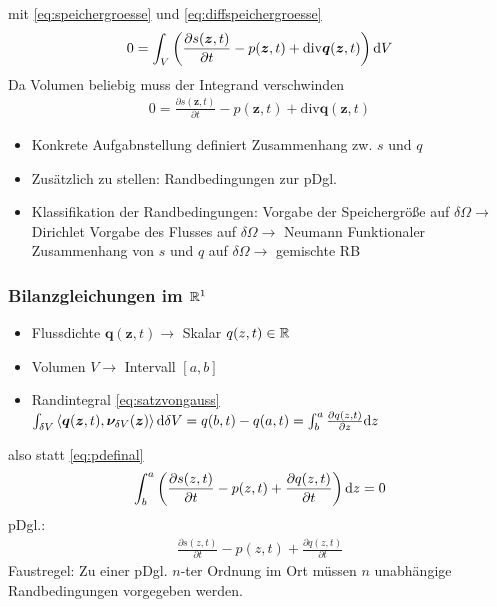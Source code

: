  mit \eqref{eq:speichergroesse} und \eqref{eq:diffspeichergroesse}
 \begin{align}
 \label{eq:pdefinal}
 0 =  \int _V \left( \frac{\partial s(\bm{z},t)}{\partial t}-p(\bm{z},t)+\mathrm{div} \bm{q}(\bm{z},t) \right) \mathrm{d} V
 \end{align}
 Da Volumen beliebig muss der Integrand verschwinden
 \begin{align}
 0 = \frac{\partial s(\bm{z},t)}{\partial t}-p(\bm{z},t)+\mathrm{div} \bm{q}(\bm{z},t) 
 \end{align}
 \begin{itemize}
 \item Konkrete Aufgabnstellung definiert Zusammenhang zw. $s$ und $q$
\item Zusätzlich zu stellen: Randbedingungen zur pDgl.
\item Klassifikation der Randbedingungen: 
\subitem Vorgabe der Speichergröße auf $\delta \Omega \rightarrow $ Dirichlet
\subitem Vorgabe des Flusses auf $\delta \Omega \rightarrow $ Neumann
\subitem Funktionaler Zusammenhang von $s$ und $q$ auf $\delta \Omega \rightarrow$ gemischte RB
 \end{itemize}
 \subsubsection{Bilanzgleichungen im $\mathbb{R}^1$}
 \begin{itemize}
 \item Flussdichte $\bm{q}(\bm{z},t) \rightarrow$ Skalar $q(z,t) \in \mathbb{R}$
 \item Volumen $V \rightarrow$ Intervall $[a,b]$
 \item Randintegral \eqref{eq:satzvongauss} $\int_{\delta V} \left\langle  \bm{q}(\bm{z},t),\bm{\nu}_{\delta V}(\bm{z})\right\rangle \mathrm{d}  \delta V = q(b,t)-q(a,t) = \int_b^a \frac{\partial q(z,t)}{\partial z}\mathrm{d} z$
 \end{itemize}
 also statt \eqref{eq:pdefinal}
 \begin{align}
 \int_b^a \left( \frac{\partial s(z,t)}{\partial t}-p(z,t)+\frac{\partial q(z,t)}{\partial t} \right) \mathrm{d} z = 0
 \end{align}
 pDgl.:
 \begin{align}
 \frac{\partial s(z,t)}{\partial t}-p(z,t)+\frac{\partial q(z,t)}{\partial t}
 \end{align}
 Faustregel: Zu einer pDgl. $n$-ter Ordnung im Ort müssen $n$ unabhängige Randbedingungen vorgegeben werden.
